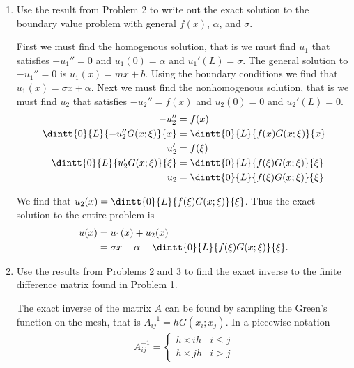 \documentclass[11pt, oneside, titlepage]{article}
\begin{document}
\begin{enumerate}
    \item %
        Use the result from Problem 2 to write out the exact solution to the
        boundary value problem with general $f(x)$, $\alpha$, and $\sigma$.

        First we must find the homogenous solution, that is we must find $u_1$
        that satisfies $-u_1'' = 0$ and $u_1(0) = \alpha$ and $u_1'(L) = \sigma$.
        The general solution to $-u_1'' = 0$ is $u_1(x) = mx + b$.
        Using the boundary conditions we find that $u_1(x) = \sigma x + \alpha$.
        Next we must find the nonhomogenous solution, that is we must find $u_2$
        that satisfies $-u_2'' = f(x)$ and $u_2(0) = 0$ and $u_2'(L) = 0$.
        \begin{align*}
            -u_2'' &= f(x) \\
            \dintt{0}{L}{-u_2'' G(x; \xi)}{x} &= \dintt{0}{L}{f(x)G(x; \xi)}{x} \\
            u_2' &= f(\xi) \\
            \dintt{0}{L}{u_2' G(x; \xi)}{\xi} &= \dintt{0}{L}{f(\xi)G(x;\xi)}{\xi} \\
            u_2 &= \dintt{0}{L}{f(\xi)G(x;\xi)}{\xi}
        \end{align*}

        We find that $u_2(x) = \dintt{0}{L}{f(\xi)G(x;\xi)}{\xi}$.
        Thus the exact solution to the entire problem is
        \begin{align*}
            u(x) &= u_1(x) + u_2(x) \\
            &= \sigma x + \alpha + \dintt{0}{L}{f(\xi)G(x;\xi)}{\xi}.
        \end{align*}

    \item %
        Use the results from Problems 2 and 3 to find the exact inverse to the
        finite difference matrix found in Problem 1.

        The exact inverse of the matrix $A$ can be found by sampling the
        Green's function on the mesh, that is $A^{-1}_{ij} = hG(x_i; x_j)$.
        In a piecewise notation
        \begin{align*}
            A^{-1}_{ij} =
            \begin{cases}
                h \times ih & i \le j \\
                h \times jh & i > j
            \end{cases}
        \end{align*}


\end{enumerate}
\end{document}
